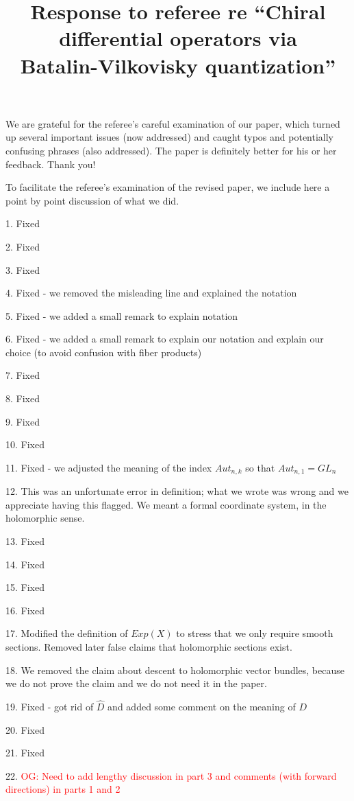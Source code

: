 \documentclass[10pt]{amsart}
\title{Response to referee re ``Chiral differential operators via\\Batalin-Vilkovisky quantization''}
\def\owen{\textcolor{red}{OG: }\textcolor{red}}
\begin{document}
\maketitle

We are grateful for the referee's careful examination of our paper, which turned up several important issues (now addressed) and caught typos and potentially confusing phrases (also addressed).
The paper is definitely better for his or her feedback.
Thank you!

To facilitate the referee's examination of the revised paper, 
we include here a point by point discussion of what we did.

1. Fixed

2. Fixed

3. Fixed

4. Fixed - we removed the misleading line and explained the notation

5. Fixed - we added a small remark to explain notation

6. Fixed - we added a small remark to explain our notation and explain our choice (to avoid confusion with fiber products)

7. Fixed

8. Fixed

9. Fixed

10. Fixed

11. Fixed - we adjusted the meaning of the index $Aut_{n,k}$ so that $Aut_{n,1} = GL_n$

12. This was an unfortunate error in definition; what we wrote was wrong and we appreciate having this flagged. We meant a formal coordinate system, in the holomorphic sense. 

13. Fixed

14. Fixed

15. Fixed

16. Fixed

17. Modified the definition of $Exp(X)$ to stress that we only require smooth sections. 
Removed later false claims that holomorphic sections exist.

18. We removed the claim about descent to holomorphic vector bundles, because we do not prove the claim and we do not need it in the paper.

19. Fixed - got rid of $\hat{D}$ and added some comment on the meaning of $D$

20. Fixed

21. Fixed

22. \owen{Need to add lengthy discussion in part 3 and comments (with forward directions) in parts 1 and 2}
\end{document}
